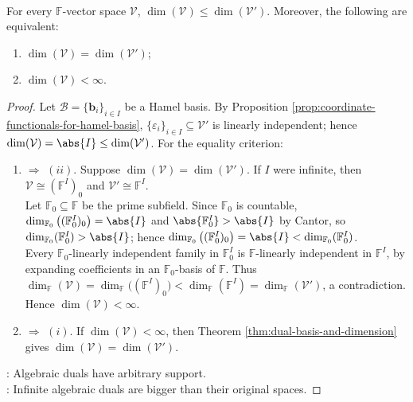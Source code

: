 \begin{theorem} \label{thm:dimension-of-algebraic-dual} \\
For every $\mathbb{F}$-vector space $\mathcal{V}$, $\dim(\mathcal{V})\leq\dim(\mathcal{V}')$. Moreover, the following are equivalent:
\begin{enumerate}[label=(\roman*)]
\setlength{\itemsep}{0pt}
\item $\dim(\mathcal{V})=\dim(\mathcal{V}')$;
\item $\dim(\mathcal{V})<\infty$.
\end{enumerate}
\begin{proof}
Let $\mathcal{B}=\{\mathbf{b}_i\}_{i\in I}$ be a Hamel basis. By Proposition \ref{prop:coordinate-functionals-for-hamel-basis}, $\{\varepsilon_i\}_{i\in I}\subseteq\mathcal{V}'$ is linearly independent; hence $\dim(\mathcal{V})=\abs{I}\leq\dim(\mathcal{V}')$. For the equality criterion:
\begin{enumerate}[label=(\roman*).]
\setlength{\itemsep}{0pt}
\item[$(i)$] $\Rightarrow$ $(ii)$. Suppose $\dim(\mathcal{V})=\dim(\mathcal{V}')$. If $I$ were infinite, then $\mathcal{V}\cong(\mathbb{F}^{I})_0$ and $\mathcal{V}'\cong\mathbb{F}^{I}$.\\
Let $\mathbb{F}_0\subseteq\mathbb{F}$ be the prime subfield. Since $\mathbb{F}_0$ is countable, $\dim_{\mathbb{F}_0}\big((\mathbb{F}_0^{I})_0\big)=\abs{I}$ and $\abs{\mathbb{F}_0^{I}}>\abs{I}$ by Cantor, so $\dim_{\mathbb{F}_0}(\mathbb{F}_0^{I})>\abs{I}$; hence $\dim_{\mathbb{F}_0}\big((\mathbb{F}_0^{I})_0\big)=\abs{I}< \dim_{\mathbb{F}_0}(\mathbb{F}_0^{I})$.\\
Every $\mathbb{F}_0$-linearly independent family in $\mathbb{F}_0^{I}$ is $\mathbb{F}$-linearly independent in $\mathbb{F}^{I}$, by expanding coefficients in an $\mathbb{F}_0$-basis of $\mathbb{F}$. Thus $\dim_{\mathbb{F}}(\mathcal{V}) =\dim_{\mathbb{F}}\big((\mathbb{F}^{I})_0\big) < \dim_{\mathbb{F}}(\mathbb{F}^{I}) =\dim_{\mathbb{F}}(\mathcal{V}')$, a contradiction. Hence $\dim(\mathcal{V})<\infty$.
\item[$(ii)$] $\Rightarrow$ $(i)$. If $\dim(\mathcal{V})<\infty$, then Theorem \ref{thm:dual-basis-and-dimension} gives $\dim(\mathcal{V})=\dim(\mathcal{V}')$.
\end{enumerate}
: Algebraic duals have arbitrary support.\\
: Infinite algebraic duals are bigger than their original spaces.
\end{proof}
\end{theorem}

